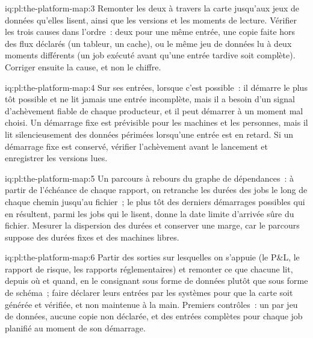 \begin{solution}{iq:pl:the-platform-map:3}
Remonter les deux à travers la carte jusqu'aux jeux de données qu'elles lisent, ainsi que les versions et les moments de lecture. Vérifier les trois causes dans
l'ordre~: deux  pour une même entrée, une copie faite hors des flux déclarés (un tableur, un cache), ou le même jeu de données
lu à deux moments différents (un job exécuté avant qu'une entrée tardive soit complète). Corriger ensuite la cause, et non le chiffre.
\end{solution}

\begin{solution}{iq:pl:the-platform-map:4}
Sur ses entrées, lorsque c'est possible~: il démarre le plus tôt possible et ne lit jamais une entrée incomplète, mais il a besoin d'un
signal d'achèvement fiable de chaque producteur, et il peut démarrer à un moment mal choisi. Un démarrage fixe est prévisible pour les machines et les personnes,
mais il lit silencieusement des données périmées lorsqu'une entrée est en retard. Si un démarrage fixe est conservé, vérifier l'achèvement avant le lancement et enregistrer
les versions lues.
\end{solution}

\begin{solution}{iq:pl:the-platform-map:5}
Un parcours à rebours du graphe de dépendances~: à partir de l'échéance de chaque rapport, on retranche les durées des jobs le long de chaque chemin jusqu'au
fichier~; le plus tôt des derniers démarrages possibles qui en résultent, parmi les jobs qui le lisent, donne la date limite d'arrivée sûre du fichier. Mesurer la
dispersion des durées et conserver une marge, car le parcours suppose des durées fixes et des machines libres.
\end{solution}

\begin{solution}{iq:pl:the-platform-map:6}
Partir des sorties sur lesquelles on s'appuie (le P\&L, le rapport de risque, les rapports réglementaires) et remonter ce que chacune lit, depuis
où et quand, en le consignant sous forme de données plutôt que sous forme de schéma~; faire déclarer leurs entrées par les systèmes pour que la carte soit générée et
vérifiée, et non maintenue à la main. Premiers contrôles~: un  par jeu de données, aucune copie non déclarée, et des entrées complètes
pour chaque job planifié au moment de son démarrage.
\end{solution}
